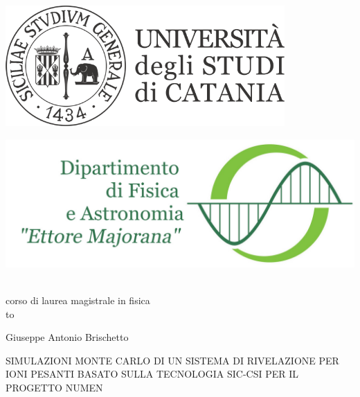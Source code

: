 \documentclass[10pt,foldmark]{leaflet}
\begin{document}
\begin{center}
\begin{minipage}[c]{0.45\textwidth}
\begin{flushleft}
\includegraphics[width=0.8\textwidth]{logo_unict_orizzontale}
\end{flushleft}
\end{minipage}
\hfill
\begin{minipage}[c]{0.45\textwidth}
\begin{flushright}
\includegraphics[width=\textwidth]{logo_dfa_orizzontale}
\end{flushright}
\end{minipage}\\
\medskip
{\sc corso di laurea magistrale in fisica}\\
\hbox to \textwidth{\hrulefill}

\vspace{3truecm}

{\sc Giuseppe Antonio Brischetto}

\vfill

\uppercase{\sc Simulazioni Monte Carlo di un sistema di rivelazione per ioni pesanti basato sulla tecnologia SiC-CsI per il progetto NUMEN}

\vfill


\end{center}
\end{document}
